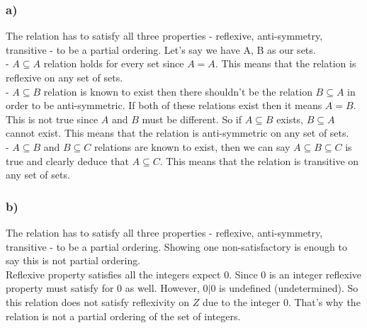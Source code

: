 \documentclass[12pt]{article}
\begin{document}
\subsubsection*{a)}
The relation has to satisfy all three properties - reflexive, anti-symmetry, transitive - to be a partial ordering. Let's say we have A, B as our sets. \\
- $A\subseteq A$ relation holds for every set since $A=A$. This means that the relation is reflexive on any set of sets.\\
- $A\subseteq B$ relation is known to exist then there shouldn't be the relation $B\subseteq A$ in order to be anti-symmetric. If both of these relations exist then it means $A=B$. This is not true since $A$ and $B$ must be different. So if $A\subseteq B$ exists, $B\subseteq A$ cannot exist. This means that the relation is anti-symmetric on any set of sets. \\
- $A\subseteq B$ and $B\subseteq C$ relations are known to exist, then we can say $A\subseteq B\subseteq C$ is true and clearly deduce that $A\subseteq C$. This means that the relation is transitive on any set of sets. 

\subsubsection*{b)}
The relation has to satisfy all three properties - reflexive, anti-symmetry, transitive - to be a partial ordering. Showing one non-satisfactory is enough to say this is not partial ordering. \\
Reflexive property satisfies all the integers expect 0. Since 0 is an integer reflexive property must satisfy for 0 as well. However, $0|0$ is undefined (undetermined). So this relation does not satisfy reflexivity on $Z$ due to the integer 0. That's why the relation is not a partial ordering of the set of integers.
\end{document}
